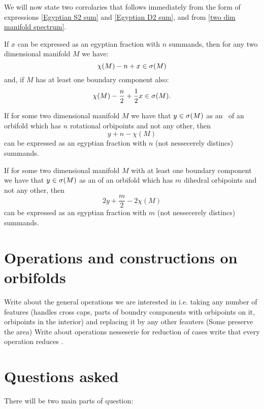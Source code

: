 We will now state two corrolaries that follows immediately from the 
form of expressions \ref{Egyptian S2 sum} and \ref{Egyptian D2 sum}, and from 
\ref{two dim manifold spectrum}.
\begin{corollary}\label{from Egyptian fractions M}
If $x$ can be expressed as an egyptian fraction with $n$ summands, then for any two dimensional 
manifold $M$ we have: 
\begin{equation}
\chi(M) - n + x \in {{\sigma}(M)}
\end{equation}
and, if $M$ has at least one boundary component also:
\begin{equation}
\chi(M) - \frac{n}{2} + \frac{1}{2}x \in {{\sigma}(M)}.
\end{equation}
\end{corollary}
\begin{corollary}\label{to egyptian fractions M}
If for some two dimensional manifold $M$ we have that $y \in {{\sigma}(M)}$ as an \Eoc\ of 
an orbifold which has $n$ rotational orbipoints and not any other, 
then 
\begin{equation}
y + n - \chi(M)
\end{equation} 
can be expressed as an egyptian fraction with $n$ 
(not nessecerely distincs) summands. 

If for some two dimensional manifold $M$ with at least one boundary component 
we have that $y \in {{\sigma}(M)}$ as an \Eoc of an orbifold which has $m$ dihedral orbipoints and 
not any other, 
then 
\begin{equation}
2y + \frac{m}{2} - 2\chi(M)
\end{equation}
can be expressed as an egyptian fraction with $m$ 
(not nessecerely distincs) summands. 
\end{corollary}

\section{Operations and constructions on orbifolds}\label{Operations}
Write about the general operations we are interested in i.e. taking any number of features (handles 
cross caps, parts of boundry components with orbipoints on it, orbipoints in the interior) and
replacing it by any other feauters
(Some preserve the area)
Write about operations nesseserie for reduction of cases
write that every operation reduces \Eoc.

\label{moving from interior to boundary}


\section{Questions asked}
There will be two main parts of question: 


